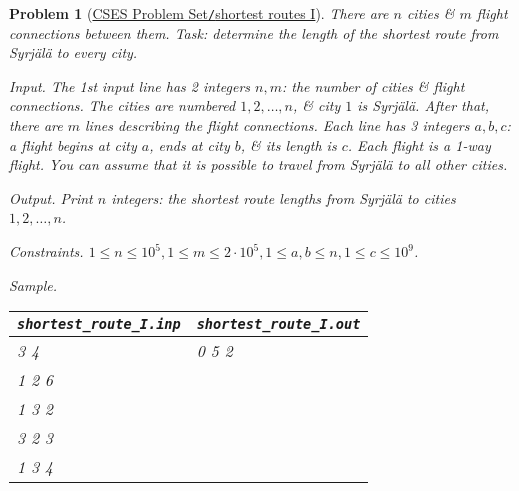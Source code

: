 \documentclass{article}
\newtheorem{problem}{Problem}
\begin{document}
\begin{problem}[\href{https://cses.fi/problemset/task/1671}{CSES Problem Set{\tt/}shortest routes I}]
	There are $n$ cities \& $m$ flight connections between them. Task: determine the length of the shortest route from Syrjälä to every city.
	\item {\sf Input.} The 1st input line has 2 integers $n,m$: the number of cities \& flight connections. The cities are numbered $1,2,\ldots,n$, \& city $1$ is Syrjälä. After that, there are $m$ lines describing the flight connections. Each line has 3 integers $a,b,c$: a flight begins at city $a$, ends at city $b$, \& its length is $c$. Each flight is a 1-way flight. You can assume that it is possible to travel from Syrjälä to all other cities.
	\item {\sf Output.} Print $n$ integers: the shortest route lengths from Syrjälä to cities $1,2,\ldots,n$.
	\item {\sf Constraints.} $1\le n\le10^5,1\le m\le2\cdot10^5,1\le a,b\le n,1\le c\le10^9$.
	\item {\sf Sample.}
	\begin{table}[H]
		\centering
		\begin{tabular}{|l|l|}
			\hline
			\verb|shortest_route_I.inp| & \verb|shortest_route_I.out| \\
			\hline
			3 4 & 0 5 2 \\
			1 2 6 & \\
			1 3 2 & \\
			3 2 3 & \\
			1 3 4 & \\
			\hline
		\end{tabular}
	\end{table}
\end{problem}
\end{document}
